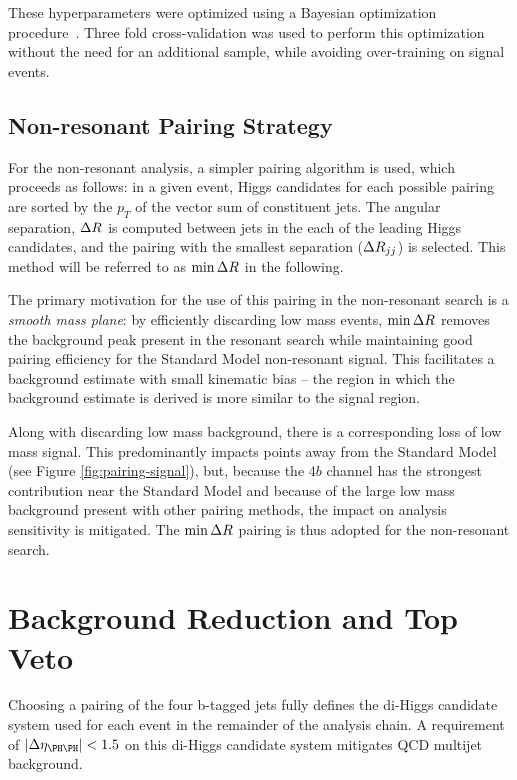 These hyperparameters were optimized using a Bayesian optimization
procedure~\cite{skopt}. Three fold cross-validation was used to perform this
optimization without the need for an additional sample, while avoiding
over-training on signal events.

\subsection{Non-resonant Pairing Strategy}
For the non-resonant analysis, a simpler pairing algorithm is used, which 
proceeds as follows: in a given event, Higgs candidates for each possible pairing
are sorted by the $p_{T}$ of the vector sum of constituent jets. The angular separation,
$\Delta R$ is computed between jets in the each of the leading Higgs candidates, and the 
pairing with the smallest separation ($\Delta R_{jj}$) is selected. This method will be 
referred to as $\min{\ensuremath{\Delta R}}$ in the following.

The primary motivation for the use of this pairing in the non-resonant search is a 
\emph{smooth mass plane}: by efficiently discarding low mass events, $\min{\ensuremath{\Delta R}}$ removes 
the background peak present in the resonant search while maintaining good pairing 
efficiency for the Standard Model non-resonant signal. This facilitates a background estimate with 
small kinematic bias -- the region in which the background estimate is derived is 
more similar to the signal region. 

Along with discarding low mass background, there is a corresponding loss of low mass signal.
This predominantly impacts points away from the Standard Model (see Figure \ref{fig:pairing-signal}), 
but, because the $4b$ channel has the strongest contribution near the Standard Model and because of the 
large low mass background present with other pairing methods, the impact on analysis sensitivity 
is mitigated. The $\min{\ensuremath{\Delta R}}$ pairing is thus adopted for the non-resonant search.

\FloatBarrier
\clearpage
\section{Background Reduction and Top Veto}
\label{sec:kinematic-cuts}

Choosing a pairing of the four b-tagged jets fully defines the di-Higgs candidate system used for each event in the remainder of the analysis chain. A requirement of
$\abs{\Delta\eta_{\higgs\higgs}} < 1.5$ on this di-Higgs candidate system mitigates
QCD multijet background.


